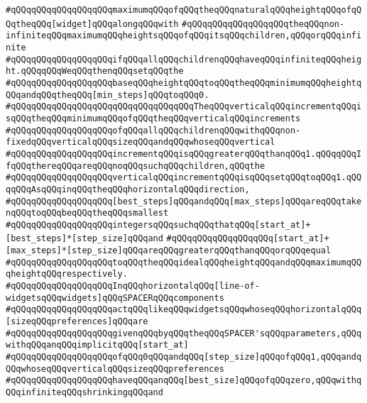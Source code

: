 \verb|#qQQqqQQqqQQqqQQqqQQqmaximumqQQqofqQQqtheqQQqnaturalqQQqheightqQQqofqQQqtheqQQq[widget]qQQqalongqQQqwith|\newline
\verb|#qQQqqQQqqQQqqQQqqQQqtheqQQqnon-infiniteqQQqmaximumqQQqheightsqQQqofqQQqitsqQQqchildren,qQQqorqQQqinfinite|\newline
\verb|#qQQqqQQqqQQqqQQqqQQqifqQQqallqQQqchildrenqQQqhaveqQQqinfiniteqQQqheight.qQQqqQQqWeqQQqthenqQQqsetqQQqthe|\newline
\verb|#qQQqqQQqqQQqqQQqqQQqbaseqQQqheightqQQqtoqQQqtheqQQqminimumqQQqheightqQQqandqQQqtheqQQq[min_steps]qQQqtoqQQq0.|\newline
\verb|#qQQqqQQqqQQqqQQqqQQqqQQqqQQqqQQqqQQqTheqQQqverticalqQQqincrementqQQqisqQQqtheqQQqminimumqQQqofqQQqtheqQQqverticalqQQqincrements|\newline
\verb|#qQQqqQQqqQQqqQQqqQQqofqQQqallqQQqchildrenqQQqwithqQQqnon-fixedqQQqverticalqQQqsizeqQQqandqQQqwhoseqQQqvertical|\newline
\verb|#qQQqqQQqqQQqqQQqqQQqincrementqQQqisqQQqgreaterqQQqthanqQQq1.qQQqqQQqIfqQQqthereqQQqareqQQqnoqQQqsuchqQQqchildren,qQQqthe|\newline
\verb|#qQQqqQQqqQQqqQQqqQQqverticalqQQqincrementqQQqisqQQqsetqQQqtoqQQq1.qQQqqQQqAsqQQqinqQQqtheqQQqhorizontalqQQqdirection,|\newline
\verb|#qQQqqQQqqQQqqQQqqQQq[best_steps]qQQqandqQQq[max_steps]qQQqareqQQqtakenqQQqtoqQQqbeqQQqtheqQQqsmallest|\newline
\verb|#qQQqqQQqqQQqqQQqqQQqintegersqQQqsuchqQQqthatqQQq[start_at]+[best_steps]*[step_size]qQQqand|\newline
\verb|#qQQqqQQqqQQqqQQqqQQq[start_at]+[max_steps]*[step_size]qQQqareqQQqgreaterqQQqthanqQQqorqQQqequal|\newline
\verb|#qQQqqQQqqQQqqQQqqQQqtoqQQqtheqQQqidealqQQqheightqQQqandqQQqmaximumqQQqheightqQQqrespectively.|\newline
\verb|#qQQqqQQqqQQqqQQqqQQqInqQQqhorizontalqQQq[line-of-widgetsqQQqwidgets]qQQqSPACERqQQqcomponents|\newline
\verb|#qQQqqQQqqQQqqQQqqQQqactqQQqlikeqQQqwidgetsqQQqwhoseqQQqhorizontalqQQq[sizeqQQqpreferences]qQQqare|\newline
\verb|#qQQqqQQqqQQqqQQqqQQqgivenqQQqbyqQQqtheqQQqSPACER'sqQQqparameters,qQQqwithqQQqanqQQqimplicitqQQq[start_at]|\newline
\verb|#qQQqqQQqqQQqqQQqqQQqofqQQq0qQQqandqQQq[step_size]qQQqofqQQq1,qQQqandqQQqwhoseqQQqverticalqQQqsizeqQQqpreferences|\newline
\verb|#qQQqqQQqqQQqqQQqqQQqhaveqQQqanqQQq[best_size]qQQqofqQQqzero,qQQqwithqQQqinfiniteqQQqshrinkingqQQqand|\newline
